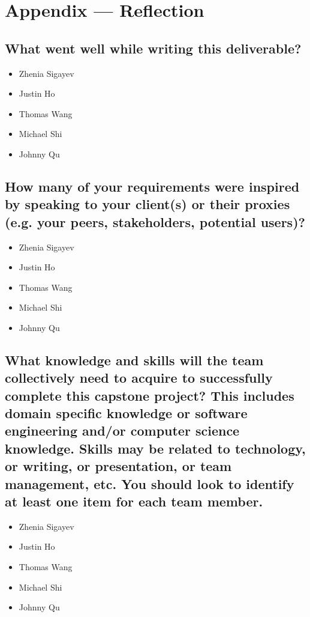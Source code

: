 \documentclass[12pt]{article}
\begin{document}
\section*{Appendix --- Reflection}

  \subsection{What went well while writing this deliverable?}
  \begin{itemize}
    \item Zhenia Sigayev
    \item Justin Ho
    \item Thomas Wang
    \item Michael Shi
    \item Johnny Qu
  \end{itemize}

  \subsection{How many of your requirements were inspired by speaking to your
    client(s) or their proxies (e.g. your peers, stakeholders, potential users)?}
  \begin{itemize}
    \item Zhenia Sigayev
    \item Justin Ho
    \item Thomas Wang
    \item Michael Shi
    \item Johnny Qu
  \end{itemize}

  \subsection{What knowledge and skills will the team collectively need to acquire to
    successfully complete this capstone project? This includes domain specific knowledge or software engineering and/or
    computer science knowledge. Skills may be related to technology, or writing,
    or presentation, or team management, etc. You should look to identify at
    least one item for each team member.}
  \begin{itemize}
    \item Zhenia Sigayev
    \item Justin Ho
    \item Thomas Wang
    \item Michael Shi
    \item Johnny Qu
  \end{itemize}
\end{document}
